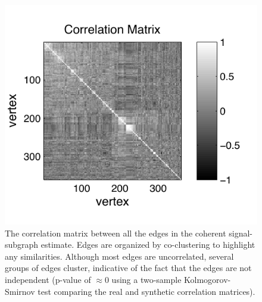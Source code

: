 \documentclass[10pt,journal,cspaper,compsoc]{IEEEtran}
\begin{document}
% 
% 
% 
% 
% 



\begin{figure}[htbp]
	\centering
		\includegraphics[width=1.0\linewidth]{../figs/BLSA0317_coclustered_corr.pdf}
	\caption{The correlation matrix between all the edges in the coherent signal-subgraph estimate. Edges are organized by co-clustering to highlight any similarities.  Although most edges are uncorrelated, several groups of edges cluster, indicative of the fact that the edges are not independent (p-value of $\approx 0$ using a two-sample Kolmogorov-Smirnov test comparing the real and synthetic correlation matrices). }
	\label{fig:cov}
\end{figure}
\end{document}

